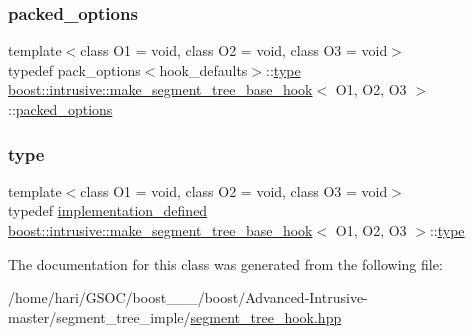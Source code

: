 \subsubsection{\texorpdfstring{packed\+\_\+options}{packed\_options}}
{\footnotesize\ttfamily template$<$class O1 = void, class O2 = void, class O3 = void$>$ \\
typedef pack\+\_\+options$<$hook\+\_\+defaults$>$\+::\hyperlink{classboost_1_1intrusive_1_1make__segment__tree__base__hook_a9c140e02f782596cc309f211a16125ab}{type} \hyperlink{classboost_1_1intrusive_1_1make__segment__tree__base__hook}{boost\+::intrusive\+::make\+\_\+segment\+\_\+tree\+\_\+base\+\_\+hook}$<$ O1, O2, O3 $>$\+::\hyperlink{classboost_1_1intrusive_1_1make__segment__tree__base__hook_a98fb49751f922d9d2bd29b788fae7de6}{packed\+\_\+options}}

\mbox{\label{classboost_1_1intrusive_1_1make__segment__tree__base__hook_a9c140e02f782596cc309f211a16125ab}} 
\subsubsection{\texorpdfstring{type}{type}}
{\footnotesize\ttfamily template$<$class O1 = void, class O2 = void, class O3 = void$>$ \\
typedef \hyperlink{classboost_1_1intrusive_1_1make__segment__tree__base__hook_ac9e2687ae1be3fafd1465686917f339b}{implementation\+\_\+defined} \hyperlink{classboost_1_1intrusive_1_1make__segment__tree__base__hook}{boost\+::intrusive\+::make\+\_\+segment\+\_\+tree\+\_\+base\+\_\+hook}$<$ O1, O2, O3 $>$\+::\hyperlink{classboost_1_1intrusive_1_1make__segment__tree__base__hook_a9c140e02f782596cc309f211a16125ab}{type}}



The documentation for this class was generated from the following file\+:\begin{DoxyCompactItemize}
\item 
/home/hari/\+G\+S\+O\+C/boost\+\_\+\_\+\_/boost/\+Advanced-\/\+Intrusive-\/master/segment\+\_\+tree\+\_\+imple/\hyperlink{segment__tree__hook_8hpp}{segment\+\_\+tree\+\_\+hook.\+hpp}\end{DoxyCompactItemize}
